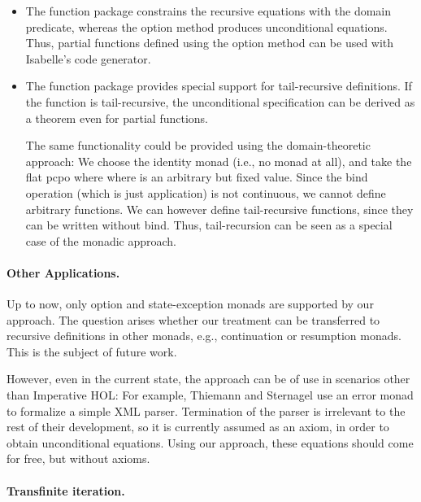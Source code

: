 \documentclass[copyright,creativecommons,sharealike]{eptcs}
\theoremstyle{remark}
\begin{document}
\begin{isabellebody}
\begin{isamarkuptext}
\begin{itemize}
\item

The function package constrains the recursive equations with
the domain predicate, 
whereas the option method produces unconditional equations.
Thus, partial functions defined using the option method can be used
with Isabelle's code generator.

\item

The function package provides special support for tail-recursive
definitions. If the function is tail-recursive, the unconditional
specification can be derived as a theorem even for partial functions.

The same functionality could be provided using the domain-theoretic
approach: We choose the identity monad (i.e., no monad at all), and
take the flat pcpo where  where  is an arbitrary but fixed value. 
Since the bind operation (which is just application) is not
continuous, we cannot define arbitrary functions. We can however
define tail-recursive functions, since they can be written without
bind.
Thus, tail-recursion can be seen as a special case of the monadic
approach.
\end{itemize}

\paragraph{Other Applications.}

  Up to now, only option and state-exception monads are supported by
  our approach.  The question arises whether our treatment can be
  transferred to recursive definitions in other monads, e.g.,
  continuation or resumption monads.  This is the subject of future work.

  However, even in the current state, the approach can be of use in
  scenarios other than Imperative HOL: For example, Thiemann and Sternagel
  \cite{ThiemannS09} use an error monad to formalize a simple XML
  parser. Termination of the parser is irrelevant to the rest of their
  development, so it is currently assumed as an axiom, in order to
  obtain unconditional equations. Using our approach, these equations
  should come for free, but without axioms.

\paragraph{Transfinite iteration.}


\end{isamarkuptext}
\end{isabellebody}
\end{document}
